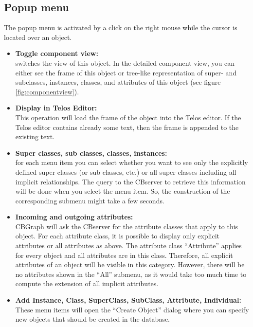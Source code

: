 \subsection{Popup menu}
\label{sec:graphed:PopupMenu}

The popup menu is activated by a click on the right mouse while the
cursor is located over an object.

\begin{itemize}
\item {\bf Toggle component view:} \\
	switches the view of this object. In the detailed component view,
	you can either see the frame of this object or tree-like
	representation of super- and subclasses, instances, classes, and
	attributes of this object (see figure \ref{fig:componentview}).
\item {\bf Display in Telos Editor:}\\
    This operation will load the frame of the object into the
    Telos editor. If the Telos editor contains already some text, then
    the frame is appended to the existing text.
\item {\bf Super classes, sub classes, classes, instances:}\\
    for each menu item you can select whether you want to
    see only the explicitly defined super classes (or sub classes, etc.)
    or all super classes including all implicit relationships.
    The query to the CBserver to retrieve this information
    will be done when you select the menu item. So, the construction
    of the corresponding submenu might take a few seconds.
\item {\bf Incoming and outgoing attributes:}\\
    CBGraph will ask the CBserver for the attribute
    classes that apply to this object. For each attribute class, it is
    possible to display only explicit attributes or all attributes as above.
    The attribute class ``Attribute'' applies for every object and all
    attributes are in this class. Therefore, all explicit attributes of
    an object will be visible in this category. However, there will be
    no attributes shown in the ``All'' submenu, as it would take too
    much time to compute the extension of all implicit attributes.
\item {\bf Add Instance, Class, SuperClass, SubClass, Attribute, Individual:}	\\
    These menu items will open the ``Create Object'' dialog where
    you can specify new objects that should be created in the database.

\end{itemize}
